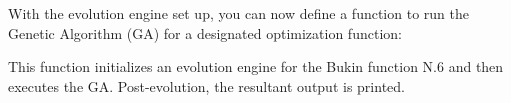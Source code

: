     With the evolution engine set up, you can now define a function to run the 
    Genetic Algorithm (GA) for a designated optimization function:


    This function initializes an evolution engine for the Bukin function N.6 
    and then executes the GA. Post-evolution, the resultant output is printed.
    